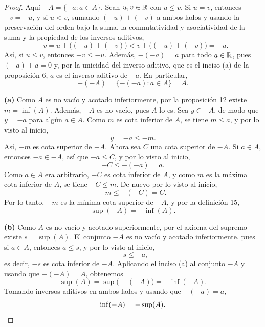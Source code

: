 \documentclass[12pt,a4paper]{article}
\begin{document}
    \begin{proof}
        Aquí $-A=\{-a:a\in A\}$. Sean $u,v\in\mathbb{R}$ con $u\leq v$. Si $u=v$, entonces $-v=-u$, y si $u<v$, sumando $(-u)+(-v)$ a ambos lados y usando la preservación del orden bajo la suma, la conmutatividad y asociatividad de la suma y la propiedad de los inversos aditivos,
        \begin{equation*}
            -v=u+\bigl((-u)+(-v)\bigr)<v+\bigl((-u)+(-v)\bigr)=-u.
        \end{equation*}
        Así, si $u\leq v$, entonces $-v\leq-u$. Además, $-(-a)=a$ para todo $a\in\mathbb{R}$, pues $(-a)+a=0$ y, por la unicidad del inverso aditivo, que es el inciso (a) de la proposición 6, $a$ es el inverso aditivo de $-a$. En particular,
        \begin{equation*}
            -(-A)=\{-(-a):a\in A\}=A.
        \end{equation*}

        \textbf{(a)} Como $A$ es no vacío y acotado inferiormente, por la proposición 12 existe $m=\inf(A)$. Además, $-A$ es no vacío, pues $A$ lo es. Sea $y\in-A$, de modo que $y=-a$ para algún $a\in A$. Como $m$ es cota inferior de $A$, se tiene $m\leq a$, y por lo visto al inicio,
        \begin{equation*}
            y=-a\leq-m.
        \end{equation*}
        Así, $-m$ es cota superior de $-A$. Ahora sea $C$ una cota superior de $-A$. Si $a\in A$, entonces $-a\in-A$, así que $-a\leq C$, y por lo visto al inicio,
        \begin{equation*}
            -C\leq-(-a)=a.
        \end{equation*}
        Como $a\in A$ era arbitrario, $-C$ es cota inferior de $A$, y como $m$ es la máxima cota inferior de $A$, se tiene $-C\leq m$. De nuevo por lo visto al inicio,
        \begin{equation*}
            -m\leq-(-C)=C.
        \end{equation*}
        Por lo tanto, $-m$ es la mínima cota superior de $-A$, y por la definición 15,
        \begin{equation*}
            \sup(-A)=-\inf(A).
        \end{equation*}

        \textbf{(b)} Como $A$ es no vacío y acotado superiormente, por el axioma del supremo existe $s=\sup(A)$. El conjunto $-A$ es no vacío y acotado inferiormente, pues si $a\in A$, entonces $a\leq s$, y por lo visto al inicio,
        \begin{equation*}
            -s\leq-a,
        \end{equation*}
        es decir, $-s$ es cota inferior de $-A$. Aplicando el inciso (a) al conjunto $-A$ y usando que $-(-A)=A$, obtenemos
        \begin{equation*}
            \sup(A)=\sup\bigl(-(-A)\bigr)=-\inf(-A).
        \end{equation*}
        Tomando inversos aditivos en ambos lados y usando que $-(-a)=a$,
        \begin{equation*}
            \inf(-A)=-\sup(A).\qedhere
        \end{equation*}
    \end{proof}
\end{document}

